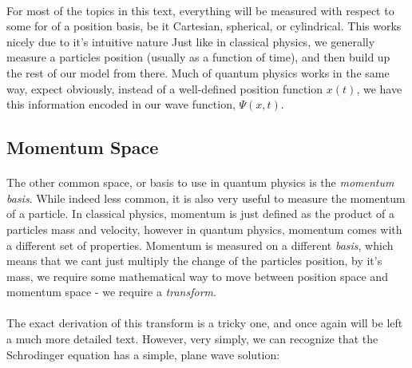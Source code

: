\documentclass[12pt,letterpaper]{book}
\begin{document}
\paragraph*{}For most of the topics in this text, everything will be measured with respect to some for of a position basis, be it Cartesian, spherical, or cylindrical. This works nicely due to it's intuitive nature Just like in classical physics, we generally measure a particles position (usually as a function of time), and then build up the rest of our model from there. Much of quantum physics works in the same way, expect obviously, instead of a well-defined position function $x(t)$, we have this information encoded in our wave function,
$\Psi(x,t)$.


\subsection*{Momentum Space}

\paragraph*{}The other common space, or basis to use in quantum physics is the \textit{momentum basis}. While indeed less common, it is also very useful to measure the momentum of a particle. In classical physics, momentum is just defined as the product of a particles mass and velocity,  however in quantum physics, momentum comes with a different set of properties. Momentum is measured on a different \textit{basis}, which means that we cant just multiply the change of the particles position, by it's mass, we require some mathematical way to move between position space and momentum space - we require a \textit{transform}.

\paragraph*{}The exact derivation of this transform is a tricky one, and once again will be left a much more detailed text. However, very simply, we can recognize that the Schrodinger equation has a simple, plane wave solution:
\end{document}
